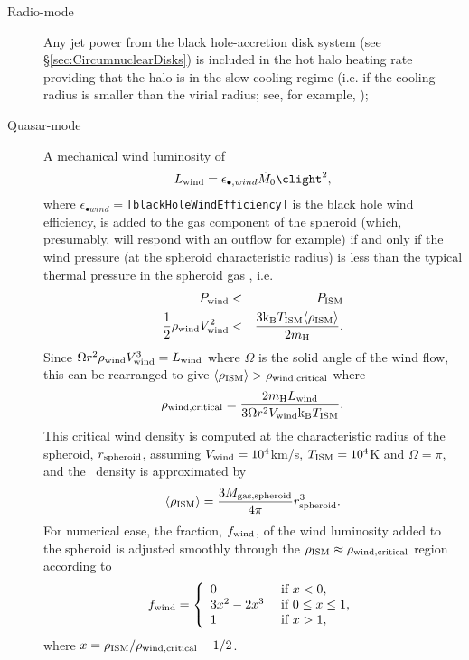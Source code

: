 \begin{description}
 \item [Radio-mode] Any jet power from the black hole-accretion disk system (see \S\ref{sec:CircumnuclearDisks}) is included in the hot halo heating rate providing that the halo is in the slow cooling regime (i.e. if the cooling radius is smaller than the virial radius; see, for example, \citealt{benson_cold_2010});
 \item [Quasar-mode] A mechanical wind luminosity of \citep{ostriker_momentum_2010}
\begin{equation}
 L_{\rm wind} = \epsilon_{\bullet, wind} \dot{M}_0 \clight^2,
\end{equation}
where $\epsilon_{\bullet wind}=${\tt [blackHoleWindEfficiency]} is the black hole wind efficiency, is added to the gas component of the spheroid (which, presumably, will respond with an outflow for example) if and only if the wind pressure (at the spheroid characteristic radius) is less than the typical thermal pressure in the spheroid gas \citep{ciotti_feedbackcentral_2009}, i.e.
\begin{eqnarray}
 P_{\rm wind} &<& P_{\rm ISM} \nonumber \\
 \frac{1}{2}\rho_{\rm wind} V_{\rm wind}^2 &<& {3 {\rm k_B} T_{\rm ISM} \langle \rho_{\rm ISM}\rangle \over 2 m_{\rm H}}.
\end{eqnarray}
Since $\Omega r^2 \rho_{\rm wind} V_{\rm wind}^3 = L_{\rm wind}$ where $\Omega$ is the solid angle of the wind flow, this can be rearranged to give $\langle\rho_{\rm ISM}\rangle > \rho_{\rm wind, critical}$ where
\begin{equation}
\rho_{\rm wind,critical} = {2 m_{\rm H} L_{\rm wind} \over 3 \Omega r^2 V_{\rm wind} {\rm k_B} T_{\rm ISM}}.
\end{equation}
This critical wind density is computed at the characteristic radius of the spheroid, $r_{\rm spheroid}$, assuming $V_{\rm wind}=10^4$km/s, $T_{\rm ISM}=10^4$K and $\Omega=\pi$, and the \ISM\ density is approximated by
\begin{equation}
 \langle\rho_{\rm ISM}\rangle = {3 M_{\rm gas, spheroid} \over 4 \pi} r_{\rm spheroid}^3.
\end{equation}
For numerical ease, the fraction, $f_{\rm wind}$, of the wind luminosity added to the spheroid is adjusted smoothly through the $\rho_{\rm ISM}\approx\rho_{\rm wind,critical}$ region according to
\begin{equation}
 f_{\rm wind} = \left\{ \begin{array}{ll} 0 & \hbox{ if } x < 0, \\ 3x^2-2x^3 & \hbox{ if } 0 \le x \le 1, \\ 1 & \hbox{ if } x > 1, \end{array} \right.
\end{equation}
where $x=\rho_{\rm ISM}/\rho_{\rm wind,critical}-1/2$.
\end{description}

